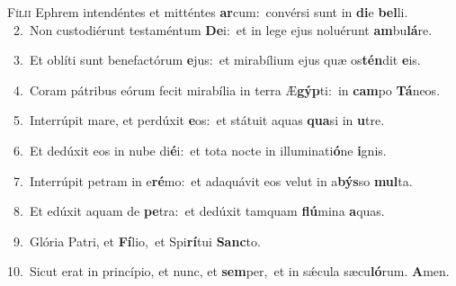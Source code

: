 \lettrine{\initial\textcolor{\initialcolor}{F}}{ílii} Ephrem intendéntes et mitténtes \textbf{ar}\-cum:~\star convérsi sunt in \textbf{di}\-e \textbf{bel}\-li.\\
{\numbfont\textcolor{\numbcolor}{~2.}}~Non custodiérunt testaméntum \textbf{De}\-i:~\star et in lege ejus noluérunt \textbf{am}\-bu\-\textbf{lá}\-re.\par
{\numbfont\textcolor{\numbcolor}{~3.}}~Et oblíti sunt benefactórum \textbf{e}\-jus:~\star et mirabílium ejus quæ os\-\textbf{tén}\-dit \textbf{e}\-is.\par
{\numbfont\textcolor{\numbcolor}{~4.}}~Coram pátribus eórum fecit mirabília in terra Æ\-\textbf{gýp}\-ti:~\star in \textbf{cam}\-po \textbf{Tá}\-neos.\par
{\numbfont\textcolor{\numbcolor}{~5.}}~Interrúpit mare, et perdúxit \textbf{e}\-os:~\star et státuit aquas \textbf{qua}\-si in \textbf{u}\-tre.\par
{\numbfont\textcolor{\numbcolor}{~6.}}~Et dedúxit eos in nube di\-\textbf{é}\-i:~\star et tota nocte in illuminati\-\textbf{ó}\-ne \textbf{i}\-gnis.\par
{\numbfont\textcolor{\numbcolor}{~7.}}~Interrúpit petram in e\-\textbf{ré}\-mo:~\star et adaquávit eos velut in a\-\textbf{býs}\-so \textbf{mul}\-ta.\par
{\numbfont\textcolor{\numbcolor}{~8.}}~Et edúxit aquam de \textbf{pe}\-tra:~\star et dedúxit tamquam \textbf{flú}\-mina \textbf{a}\-quas.\par
{\numbfont\textcolor{\numbcolor}{~9.}}~Glória Patri, et \textbf{Fí}\-lio,~\star et Spi\-\textbf{rí}\-tui \textbf{Sanc}\-to.\par
{\numbfont\textcolor{\numbcolor}{10.}}~Sicut erat in princípio, et nunc, et \textbf{sem}\-per,~\star et in sǽcula sæcu\-\textbf{ló}\-rum. \textbf{A}\-men.\par
